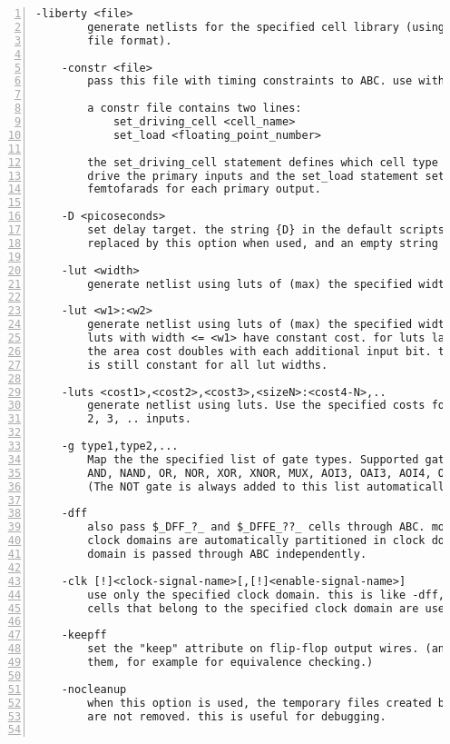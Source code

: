 \begin{lstlisting}[numbers=left,frame=single]
    -liberty <file>
        generate netlists for the specified cell library (using the liberty
        file format).

    -constr <file>
        pass this file with timing constraints to ABC. use with -liberty.

        a constr file contains two lines:
            set_driving_cell <cell_name>
            set_load <floating_point_number>

        the set_driving_cell statement defines which cell type is assumed to
        drive the primary inputs and the set_load statement sets the load in
        femtofarads for each primary output.

    -D <picoseconds>
        set delay target. the string {D} in the default scripts above is
        replaced by this option when used, and an empty string otherwise.

    -lut <width>
        generate netlist using luts of (max) the specified width.

    -lut <w1>:<w2>
        generate netlist using luts of (max) the specified width <w2>. All
        luts with width <= <w1> have constant cost. for luts larger than <w1>
        the area cost doubles with each additional input bit. the delay cost
        is still constant for all lut widths.

    -luts <cost1>,<cost2>,<cost3>,<sizeN>:<cost4-N>,..
        generate netlist using luts. Use the specified costs for luts with 1,
        2, 3, .. inputs.

    -g type1,type2,...
        Map the the specified list of gate types. Supported gates types are:
        AND, NAND, OR, NOR, XOR, XNOR, MUX, AOI3, OAI3, AOI4, OAI4.
        (The NOT gate is always added to this list automatically.)

    -dff
        also pass $_DFF_?_ and $_DFFE_??_ cells through ABC. modules with many
        clock domains are automatically partitioned in clock domains and each
        domain is passed through ABC independently.

    -clk [!]<clock-signal-name>[,[!]<enable-signal-name>]
        use only the specified clock domain. this is like -dff, but only FF
        cells that belong to the specified clock domain are used.

    -keepff
        set the "keep" attribute on flip-flop output wires. (and thus preserve
        them, for example for equivalence checking.)

    -nocleanup
        when this option is used, the temporary files created by this pass
        are not removed. this is useful for debugging.


\end{lstlisting}
